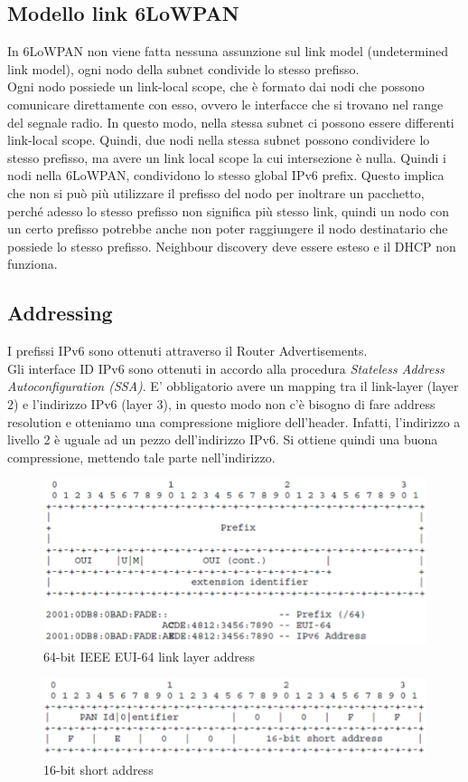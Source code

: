\documentclass{article}
\begin{document}
\subsection{Modello link 6LoWPAN}
In 6LoWPAN non viene fatta nessuna assunzione sul link model (undetermined link model), ogni nodo della subnet condivide lo stesso prefisso. \\ Ogni nodo possiede un link-local scope, che è formato dai nodi che possono comunicare direttamente con esso, ovvero le interfacce che si trovano nel range del segnale radio. In questo modo, nella stessa subnet ci possono essere differenti link-local scope. Quindi, due nodi nella stessa subnet possono condividere lo stesso prefisso, ma avere un link local scope la cui intersezione è nulla. Quindi i nodi nella 6LoWPAN, condividono lo stesso global IPv6 prefix. Questo implica che non si può più utilizzare il prefisso del nodo per inoltrare un pacchetto, perché adesso lo stesso prefisso non significa più stesso link, quindi un nodo con un certo prefisso potrebbe anche non poter raggiungere il nodo destinatario che possiede lo stesso prefisso. Neighbour discovery deve essere esteso e il DHCP non funziona.

\subsection{Addressing}
I prefissi IPv6 sono ottenuti attraverso il Router Advertisements. \\ Gli interface ID IPv6 sono ottenuti in accordo alla procedura \textit{Stateless Address Autoconfiguration (SSA)}. E' obbligatorio avere un mapping tra il link-layer (layer 2) e l'indirizzo IPv6 (layer 3), in questo modo non c'è bisogno di fare address resolution e otteniamo una compressione migliore dell'header. Infatti, l'indirizzo a livello 2 è uguale ad un pezzo dell'indirizzo IPv6. Si ottiene quindi una buona compressione, mettendo tale parte nell'indirizzo.
\begin{figure}[H]
\centering
\includegraphics[scale=0.4]{figures/64bit link layer address.png}
\caption{64-bit IEEE EUI-64 link layer address}
\end{figure}
\begin{figure}[H]
\centering
\includegraphics[scale=0.4]{figures/16bit short address.png}
\caption{16-bit short address}
\end{figure}
\end{document}
